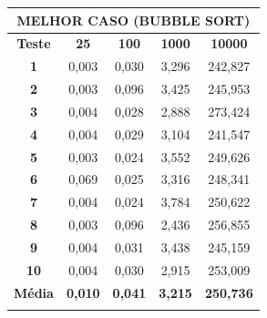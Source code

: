 \documentclass[a4paper, 12pt]{article}
\begin{document}
\begin{minipage}{1.0\textwidth}
  \begin{minipage}[c]{0.49\textwidth}
  \centering
    \begin{tabular}{ccccc}
                        \multicolumn{ 5}{c}{{\bf MELHOR CASO (BUBBLE SORT)}} \\
\hline
{\bf Teste} &  {\bf 25} & {\bf 100} & {\bf 1000} & {\bf 10000} \\
\hline
   {\bf 1} &      0,003 &      0,030 &      3,296 &    242,827 \\
\hline
   {\bf 2} &      0,003 &      0,096 &      3,425 &    245,953 \\
\hline
   {\bf 3} &      0,004 &      0,028 &      2,888 &    273,424 \\
\hline
   {\bf 4} &      0,004 &      0,029 &      3,104 &    241,547 \\
\hline
   {\bf 5} &      0,003 &      0,024 &      3,552 &    249,626 \\
\hline
   {\bf 6} &      0,069 &      0,025 &      3,316 &    248,341 \\
\hline
   {\bf 7} &      0,004 &      0,024 &      3,784 &    250,622 \\
\hline
   {\bf 8} &      0,003 &      0,096 &      2,436 &    256,855 \\
\hline
   {\bf 9} &      0,004 &      0,031 &      3,438 &    245,159 \\
\hline
  {\bf 10} &      0,004 &      0,030 &      2,915 &    253,009 \\
\hline
{\bf Média} & {\bf 0,010} & {\bf 0,041} & {\bf 3,215} & {\bf 250,736} \\
\hline
           &            &            &            &            \\
\end{tabular}  

  \end{minipage}
 \hfill
 \begin{minipage}[c]{0.49\textwidth}
 \centering
{}\hfill

\end{minipage}
\end{minipage}
\end{document}
